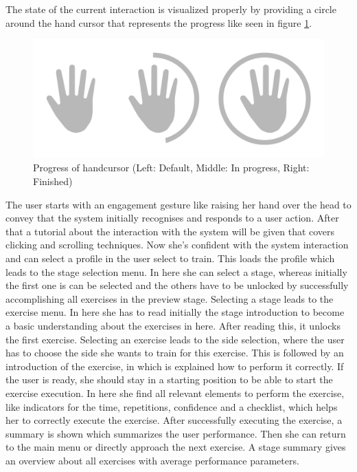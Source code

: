 The state of the current interaction is visualized properly by providing a circle around the hand cursor that represents the progress like seen in figure \ref{fig:handcursorProgress}.
\begin{figure}[htb]
	\centering
	\begin{minipage}[t]{1\linewidth}
		\centering
		\includegraphics[width=0.6\linewidth]{Pictures/handcursorProgress}
		\caption{Progress of handcursor (Left: Default, Middle: In progress, Right: Finished)}
		\label{fig:handcursorProgress}
	\end{minipage}
\end{figure}



The user starts with an engagement gesture like raising her hand over the head to convey that the system initially recognises and responds to a user action. After that a tutorial about the interaction with the system will be given that covers clicking and scrolling techniques. Now she's confident with the system interaction and can select a profile in the user select to train. This loads the profile which leads to the stage selection menu. In here she can select a stage, whereas initially the first one is can be selected and the others have to be unlocked by successfully accomplishing all exercises in the preview stage. Selecting a stage leads to the exercise menu. In here she has to read initially the stage introduction to become a basic understanding about the exercises in here. After reading this, it unlocks the first exercise. Selecting an exercise leads to the side selection, where the user has to choose the side she wants to train for this exercise. This is followed by an introduction of the exercise, in which is explained how to perform it correctly. If the user is ready, she should stay in a starting position to be able to start the exercise execution. In here she find all relevant elements to perform the exercise, like indicators for the time, repetitions, confidence and a checklist, which helps her to correctly execute the exercise. After successfully executing the exercise, a summary is shown which summarizes the user performance. Then she can return to the main menu or directly approach the next exercise. A stage summary gives an overview about all exercises with average performance parameters.

